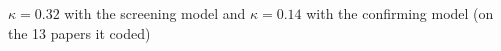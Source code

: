 $\kappa = 0.32$ with the screening model and $\kappa = 0.14$ with the confirming model (on the 13 papers it coded)